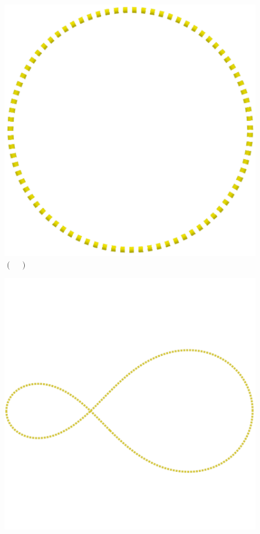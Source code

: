 \documentclass[a4paper, 12pt]{article}
\begin{document}
\begin{flushleft}
\begin{itemize}
\begin{itemize}
\begin{multicols}{2}
\begin{figure}[H]
							\includegraphics[scale=0.15]{./img/5b.png}
							\captionsetup{labelformat=empty}
							\caption{$(\quad)$}
						\end{figure}
						\begin{figure}[H]
							\centering
							\includegraphics[scale=0.15]{./img/5c.png}

\end{figure}
\end{multicols}
\end{itemize}
\end{itemize}
\end{flushleft}
\end{document}
